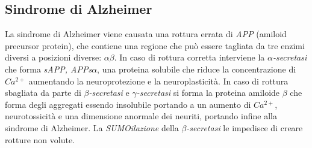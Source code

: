 \subsection{Sindrome di Alzheimer}
La sindrome di Alzheimer viene causata una rottura errata di \emph{APP} (amiloid precursor protein), che contiene una regione che pu\`o essere tagliata da tre enzimi diversi a posizioni diverse: $\alpha\beta$. 
In caso di rottura corretta interviene la \emph{$\alpha$-secretasi} che forma \emph{sAPP, APPs$\alpha$}, una proteina solubile che riduce la concentrazione di \emph{$Ca^{2+}$} aumentando la neuroprotezione e la neuroplasticit\`a. 
In caso di rottura sbagliata da parte di \emph{$\beta$-secretasi} e \emph{$\gamma$-secretasi} si forma la proteina amiloide $\beta$ che forma degli aggregati essendo insolubile portando a un aumento di \emph{$Ca^{2+}$}, neurotossicit\`a e una dimensione anormale dei neuriti, portando infine alla sindrome di Alzheimer. 
La \emph{SUMOilazione} della \emph{$\beta$-secretasi} le impedisce di creare rotture non volute.
